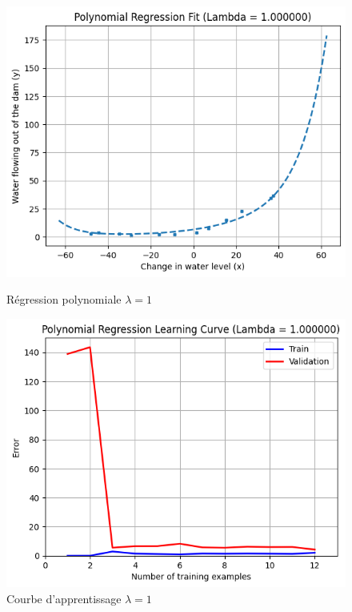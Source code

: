 \begin{figure}[!h]
    \begin{minipage}{.48\linewidth}
        \begin{center}
            \includegraphics[width=.8\textwidth]{./img/5.2(1).png}
            \caption{\label{fig:reg-poly-1}Régression polynomiale $\lambda = 1$}  
        \end{center}
    \end{minipage}\hfill
    \begin{minipage}{.48\linewidth}
        \begin{center}
            \includegraphics[width=.8\textwidth]{./img/5.2(2).png}
            \caption{\label{fig:learning-curve-poly-1}Courbe d'apprentissage $\lambda = 1$}  
        \end{center}
    \end{minipage}
\end{figure}


